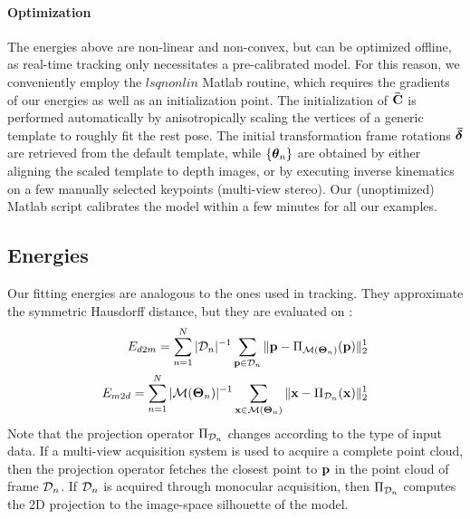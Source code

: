 \paragraph{Optimization}
The energies above are non-linear and non-convex, but can be optimized offline, as real-time tracking only necessitates a pre-calibrated model. For this reason, we conveniently employ the $lsqnonlin$ Matlab routine, which requires the gradients of our energies as well as an initialization point.
The initialization of ${\mathbf{\bar{C}}}$ is performed automatically by anisotropically scaling the vertices of a generic template to roughly fit the rest pose. The initial transformation frame rotations $\boldsymbol{\bar\delta}$ are retrieved from the default template, while ${\{\boldsymbol{\theta}_n\}}$ are obtained by either aligning the scaled template to depth images, or by executing inverse kinematics on a few manually selected keypoints (multi-view stereo).
% 
% 
Our (unoptimized) Matlab script calibrates the model within a few minutes for all our examples.


\subsection{Energies}
Our fitting energies are analogous to the ones used in tracking. They approximate the symmetric Hausdorff distance, but they are evaluated on :
% 
\begin{eqnarray}
E_{d2m} = 
\sum_{n=1}^N |\mathcal{D}_n|^{-1} 
\sum_{\mathbf{p} \in \mathcal{D}_n} 
\| \mathbf{p} - \Pi_{\mathcal{M}(\boldsymbol{\Theta}_n)}(\mathbf{p})\|_2^1 \\
E_{m2d} = 
\sum_{n=1}^N |\mathcal{M}(\boldsymbol{\Theta}_n)|^{-1} 
\sum_{\mathbf{x} \in \mathcal{M}(\boldsymbol{\Theta}_n)} 
\| \mathbf{x} - \Pi_{\mathcal{D}_n}(\mathbf{x})\|_2^1
\end{eqnarray}
% 
Note that the projection operator $\Pi_{\mathcal{D}_n}$ changes according to the type of input data. If a multi-view acquisition system is used to acquire a complete point cloud, then the projection operator fetches the closest point to $\mathbf{p}$ in the point cloud of frame $\mathcal{D}_n$. If $\mathcal{D}_n$ is acquired through monocular acquisition, then $\Pi_{\mathcal{D}_n}$ computes the 2D projection to the image-space silhouette of the model.

